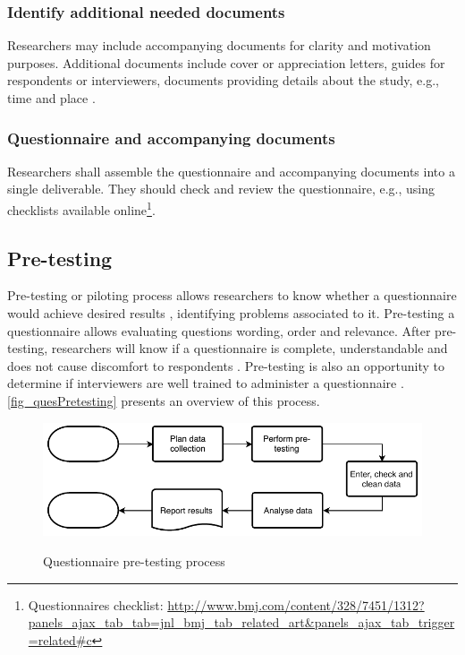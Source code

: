 \subsubsection{Identify additional needed documents}
Researchers may include accompanying documents for clarity and motivation purposes. Additional documents include cover or appreciation letters, guides for respondents or interviewers, documents providing details about the study, e.g., time and place \autocite{Diem,Crawford1997,Boynton2004b}.

\subsubsection{Questionnaire and accompanying documents}
Researchers shall assemble the questionnaire and accompanying documents into a single deliverable. They should check and review the questionnaire, e.g., using checklists available online\footnote{Questionnaires checklist: \url{http://www.bmj.com/content/328/7451/1312?panels_ajax_tab_tab=jnl_bmj_tab_related_art&panels_ajax_tab_trigger=related\#c}}.

\subsection{Pre-testing}
\label{sec:ques_pretesting}
Pre-testing or piloting process allows researchers to know whether a questionnaire would achieve desired results \autocite{Crawford1997}, identifying problems associated to it. Pre-testing a questionnaire allows evaluating questions wording, order and relevance. After pre-testing, researchers will know if a questionnaire is complete, understandable and does not cause discomfort to respondents \autocite{Boynton2004}. Pre-testing is also an opportunity to determine if interviewers are well trained to administer a questionnaire \autocite{Crawford1997}. \autoref{fig_quesPretesting} presents an overview of this process.

\begin{figure}[htb]
\myfloatalign
{\includegraphics[width=0.9\linewidth]{gfx/standard/quesPretesting}} \quad
\caption[Questionnaire pre-testing process]{Questionnaire pre-testing process}\label{fig_quesPretesting}
\end{figure}

